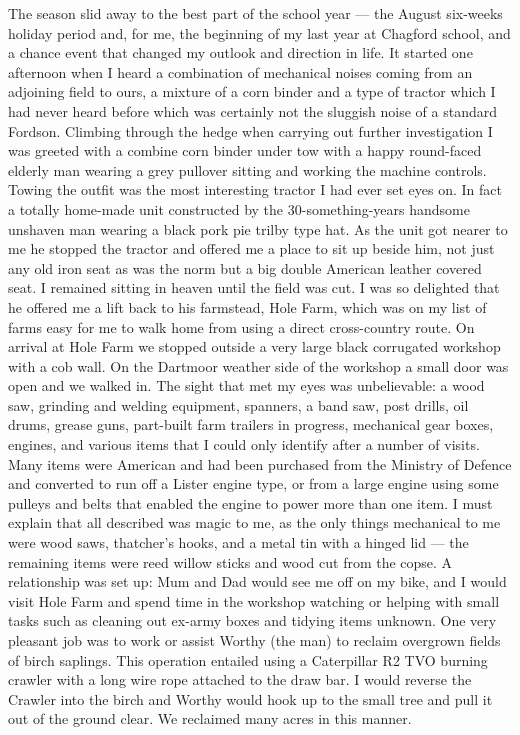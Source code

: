 The season slid away to the best part of the school year --- the August
six-weeks holiday period and, for me, the beginning of my last year at Chagford
school, and a chance event that changed my outlook and direction in life. It
started one afternoon when I heard a combination of mechanical noises coming
from an adjoining field to ours, a mixture of a corn binder and a type of
tractor which I had never heard before which was certainly not the sluggish
noise of a standard Fordson. Climbing through the hedge when carrying out
further investigation I was greeted with a combine corn binder under tow with a
happy round-faced elderly man wearing a grey pullover sitting and working the
machine controls. Towing the outfit was the most interesting tractor I had ever
set eyes on. In fact a totally home-made unit constructed by the
30-something-years handsome unshaven man wearing a black pork pie trilby type
hat. As the unit got nearer to me he stopped the tractor and offered me a place
to sit up beside him, not just any old iron seat as was the norm but a big
double American leather covered seat. I remained sitting in heaven until the
field was cut. I was so delighted that he offered me a lift back to his
farmstead, Hole Farm, which was on my list of farms easy for me to walk home
from using a direct cross-country route. On arrival at Hole Farm we stopped
outside a very large black corrugated workshop with a cob wall. On the Dartmoor
weather side of the workshop a small door was open and we walked in. The sight
that met my eyes was unbelievable: a wood saw, grinding and welding equipment,
spanners, a band saw, post drills, oil drums, grease guns, part-built farm
trailers in progress, mechanical gear boxes, engines, and various items that I
could only identify after a number of visits. Many items were American and had
been purchased from the Ministry of Defence and converted to run off a Lister
engine type, or from a large engine using some pulleys and belts that enabled
the engine to power more than one item. I must explain that all described was
magic to me, as the only things mechanical to me were wood saws, thatcher's
hooks, and a metal tin with a hinged lid --- the remaining items were reed
willow sticks and wood cut from the copse. A relationship was set up: Mum and
Dad would see me off on my bike, and I would visit Hole Farm and spend time in
the workshop watching or helping with small tasks such as cleaning out ex-army
boxes and tidying items unknown. One very pleasant job was to work or assist
Worthy (the man) to reclaim overgrown fields of birch saplings. This operation
entailed using a Caterpillar R2 TVO burning crawler with a long wire rope
attached to the draw bar. I would reverse the Crawler into the birch and Worthy
would hook up to the small tree and pull it out of the ground clear. We
reclaimed many acres in this manner.

